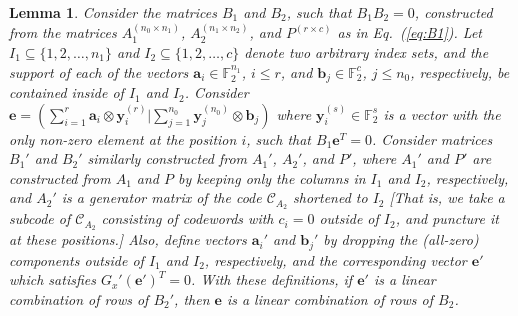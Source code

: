 \documentclass[aps,prb,12pt,tightenlines,%
notitlepage,longbibliography]{revtex4-1}
\newtheorem{lemma}[theorem]{Lemma}
\begin{document}
\begin{lemma}
  \label{th:subset-linear-dependence}
  Consider the matrices $B_1$ and $B_2$, such that $B_1B_2=0$,
  constructed from the matrices $A_1^{(n_0\times n_1)}$,
  $A_2^{(n_1\times n_2)}$, and $P^{(r\times c)}$ as in
  Eq.~(\ref{eq:B1}).  Let $I_1\subseteq\{1,2,\ldots,n_1\}$ and
  $I_2\subseteq\{1,2,\ldots,c\}$ denote two arbitrary index sets, and
  the support of each of the vectors
  $\mathbf{a}_i\in \mathbb{F}_2^{n_1}$, $i\le r$, and
  $\mathbf{b}_j\in \mathbb{F}_2^{c}$, $j\le n_0$, respectively, be
  contained inside of $I_1$ and $I_2$.  Consider
  $\mathbf{e}=(\sum_{i=1}^{r} \mathbf{a}_{i}\otimes
  \mathbf{y}_i^{(r)}|\sum_{j=1}^{n_0} \mathbf{y}_j^{(n_0)}\otimes
  \mathbf{b}_j)$ where $\mathbf{y}_i^{(s)}\in\mathbb{F}_2^s$ is a
  vector with the only non-zero element at the position $i$, such that
  $B_1 \mathbf{e}^T=0$.  Consider matrices $B_1'$ and $B_2'$ similarly
  constructed from $A_1'$, $A_2'$, and $P'$, where $A_1'$ and $P'$ are
  constructed from $A_1$ and $P$ by keeping only the columns in $I_1$
  and $I_2$, respectively, and $A_2'$ is a generator matrix of the
  code $\mathcal{C}_{A_2}$ \emph{shortened} to $I_2$ [That is, we take
  a subcode of $\mathcal{C}_{A_2}$ consisting of codewords with
  $c_i=0$ outside of $I_2$, and \emph{puncture} it at these
  positions.]  Also, define vectors $\mathbf{a}_i'$ and
  $\mathbf{b}_j'$ by dropping the (all-zero) components outside of
  $I_1$ and $I_2$, respectively, and the corresponding vector
  $\mathbf{e}'$ which satisfies $G_x'(\mathbf{e}')^T=0$.  With these
  definitions, if $\mathbf{e}'$ is a linear combination of rows of
  $B_2'$, then $\mathbf{e}$ is a linear combination of rows of $B_2$.
\end{lemma}
\end{document}
